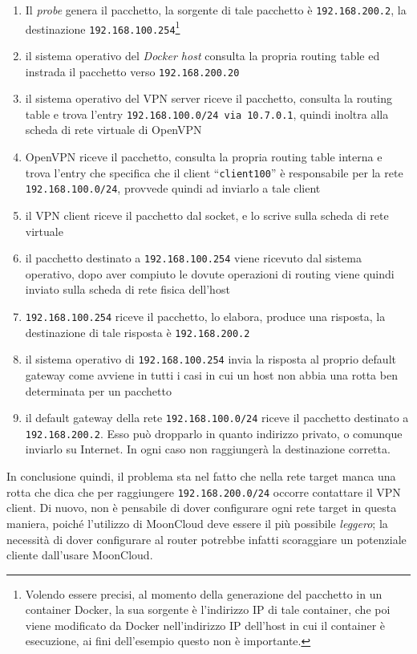 \begin{enumerate}
  \item Il \textit{probe} genera il pacchetto, la sorgente di tale pacchetto è
  \texttt{192.168.200.2}, la destinazione \texttt{192.168.100.254}\footnote{Volendo essere
  precisi, al momento della generazione
  del pacchetto in un container Docker, la sua sorgente è l'indirizzo IP di tale
  container, che poi viene modificato da Docker nell'indirizzo IP dell'host in cui
  il container è esecuzione, ai fini dell'esempio questo non è importante.}
  \item il sistema operativo del \textit{Docker host} consulta la propria routing table
  ed instrada il pacchetto verso \texttt{192.168.200.20}
  \item il sistema operativo del VPN server riceve il pacchetto, consulta la
  routing table e trova l'entry \texttt{192.168.100.0/24 via 10.7.0.1}, quindi inoltra
  alla scheda di rete virtuale di OpenVPN
  \item OpenVPN riceve il pacchetto, consulta la propria routing table interna e
  trova l'entry che specifica che il client ``\texttt{client100}'' è responsabile per
  la rete \texttt{192.168.100.0/24}, provvede quindi ad inviarlo a tale client
  \item il VPN client riceve il pacchetto dal socket, e lo scrive sulla scheda di rete
  virtuale
  \item il pacchetto destinato a \texttt{192.168.100.254} viene ricevuto dal sistema
  operativo, dopo aver compiuto le dovute operazioni di routing viene quindi inviato
  sulla scheda di rete fisica dell'host
  \item \texttt{192.168.100.254} riceve il pacchetto, lo elabora, produce una risposta,
  la destinazione di tale risposta è \texttt{192.168.200.2}
  \item il sistema operativo di \texttt{192.168.100.254} invia la risposta al proprio
  default gateway come avviene in tutti i casi in cui un host non abbia una rotta
  ben determinata per un pacchetto
  \item il default gateway della rete \texttt{192.168.100.0/24} riceve il pacchetto
  destinato a \texttt{192.168.200.2}. Esso può dropparlo in quanto indirizzo privato, o
  comunque inviarlo su Internet. In ogni caso non raggiungerà la destinazione corretta.
\end{enumerate}
In conclusione quindi, il problema sta nel fatto che nella rete target manca una rotta
che dica che per raggiungere \texttt{192.168.200.0/24} occorre contattare il
VPN client. Di nuovo, non è pensabile di dover configurare ogni rete target in questa
maniera, poiché l'utilizzo di MoonCloud deve essere il più possibile \textit{leggero};
la necessità di dover configurare al router potrebbe infatti scoraggiare un potenziale
cliente dall'usare MoonCloud.

